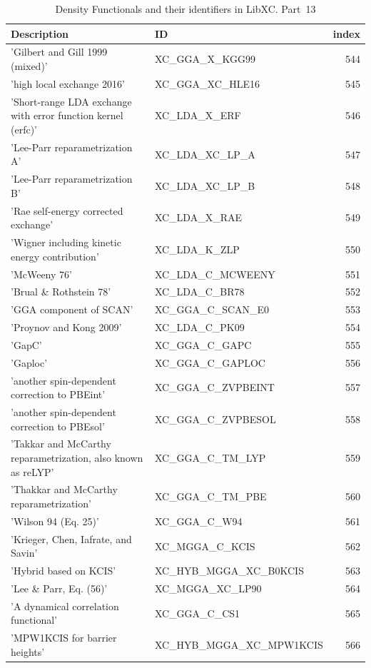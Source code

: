\documentclass[final,12pt]{article}
\begin{document}
{{{{{{\begin{table}[!h]
\caption{Density Functionals and their identifiers in LibXC. Part~13}
\begin{center}
\begin{tabular}{llr}
\hline
\hline
Description & ID & index\\
\hline
  'Gilbert and Gill 1999 (mixed)' & XC\_GGA\_X\_KGG99  &544\\
  'high local exchange 2016' & XC\_GGA\_XC\_HLE16  &545\\
  'Short-range LDA exchange with error function kernel (erfc)' & XC\_LDA\_X\_ERF  &546\\
  'Lee-Parr reparametrization A' & XC\_LDA\_XC\_LP\_A  &547\\
  'Lee-Parr reparametrization B' & XC\_LDA\_XC\_LP\_B  &548\\
  'Rae self-energy corrected exchange' & XC\_LDA\_X\_RAE  &549\\
  'Wigner including kinetic energy contribution' & XC\_LDA\_K\_ZLP  &550\\
  'McWeeny 76' & XC\_LDA\_C\_MCWEENY  &551\\
  'Brual \& Rothstein 78' & XC\_LDA\_C\_BR78  &552\\
  'GGA component of SCAN' & XC\_GGA\_C\_SCAN\_E0  &553\\
  'Proynov and Kong 2009' & XC\_LDA\_C\_PK09  &554\\
  'GapC' & XC\_GGA\_C\_GAPC  &555\\
  'Gaploc' & XC\_GGA\_C\_GAPLOC  &556\\
  'another spin-dependent correction to PBEint' & XC\_GGA\_C\_ZVPBEINT  &557\\
  'another spin-dependent correction to PBEsol' & XC\_GGA\_C\_ZVPBESOL  &558\\
  'Takkar and McCarthy reparametrization, also known as reLYP' & XC\_GGA\_C\_TM\_LYP  &559\\
  'Thakkar and McCarthy reparametrization' & XC\_GGA\_C\_TM\_PBE  &560\\
  'Wilson 94 (Eq. 25)' & XC\_GGA\_C\_W94  &561\\
  'Krieger, Chen, Iafrate, and Savin' & XC\_MGGA\_C\_KCIS  &562\\
  'Hybrid based on KCIS' & XC\_HYB\_MGGA\_XC\_B0KCIS  &563\\
  'Lee \& Parr, Eq. (56)' & XC\_MGGA\_XC\_LP90  &564\\
  'A dynamical correlation functional' & XC\_GGA\_C\_CS1  &565\\
  'MPW1KCIS for barrier heights' & XC\_HYB\_MGGA\_XC\_MPW1KCIS  &566\\

\end{tabular}
\end{center}
\end{table}}}}}}}
\end{document}

